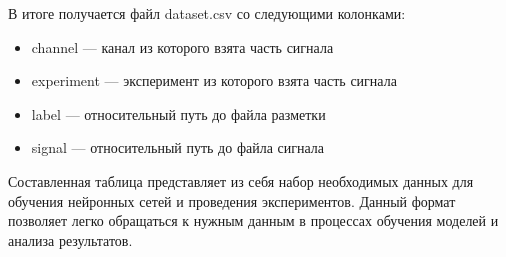В итоге получается файл dataset.csv со следующими колонками:

\begin{itemize}
	\item channel --- канал из которого взята часть сигнала
	\item experiment --- эксперимент из которого взята часть сигнала
	\item label --- относительный путь до файла разметки
	\item signal --- относительный путь до файла сигнала
\end{itemize}

\noindent Составленная таблица представляет из себя набор необходимых данных
для обучения нейронных сетей и проведения экспериментов. Данный формат
позволяет легко обращаться к нужным данным в процессах обучения моделей и
анализа результатов.
